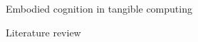 \documentclass{article}
\begin{document}

\begin{titlepage}
\pagecolor{chaptertitlepagecolor}
\noindent
\color{white}
\large
{\textsf{Embodied cognition in tangible computing}}\\ 
\makebox[0pt][l]{\rule{1.3\textwidth}{1pt}}
\par
\noindent
\textcolor{chapternamecolor}
{\textsf{Literature review}}\vfill
\end{titlepage}
\restoregeometry %
\pagecolor{white}
\end{document}
